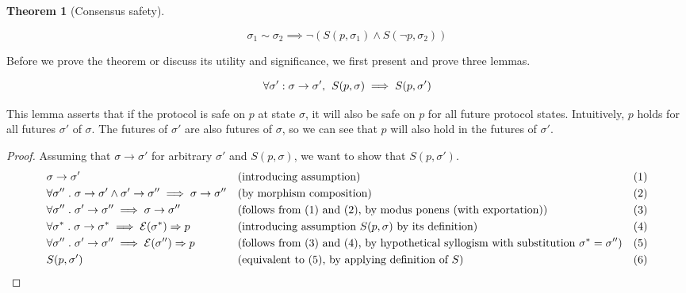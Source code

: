 \documentclass{article}
\theoremstyle{definition}
\newtheorem{thm}{Theorem}
\begin{document}
\begin{thm}[Consensus safety]
\begin{description}
$$
\sigma_1 \sim \sigma_2 \implies \neg(S(p,\sigma_1) \land S(\neg{p},\sigma_2))
$$
\end{description}
\end{thm}

Before we prove the theorem or discuss its utility and significance, we first present and prove three lemmas.

\vspace{5mm}

\begin{lemma}
$$
\forall \sigma':\sigma \to \sigma',\hspace{1.5mm} S(p,\sigma) \implies S(p,\sigma')
$$
\end{lemma}

This lemma asserts that if the protocol is safe on $p$ at state $\sigma$, it will also be safe on $p$ for all future protocol states. Intuitively, $p$ holds for all futures $\sigma'$ of $\sigma$. The futures of $\sigma'$ are also futures of $\sigma$, so we can see that $p$ will also hold in the futures of $\sigma'$.

\begin{proof}
Assuming that $\sigma \to \sigma'$ for arbitrary $\sigma'$ and $S(p, \sigma)$, we want to show that $S(p, \sigma')$.
  \begin{align*}
    &\sigma \to \sigma' &&\text{(introducing assumption)}   &&\text{(1)}\\
    &\forall \sigma'' \hspace{1mm}.\hspace{1mm}\sigma \to \sigma' \land \sigma' \to \sigma'' \implies \sigma \to \sigma'' &&\text{(by morphism composition)}   &&\text{(2)}\\
    &\forall \sigma'' \hspace{1mm}.\hspace{1mm}\sigma' \to \sigma'' \implies \sigma \to \sigma'' &&\text{(follows from (1) and (2), by modus ponens (with exportation))}   &&\text{(3)}\\
    &\forall \sigma^* \hspace{1mm}.\hspace{1mm}\sigma \to \sigma^* \implies \mathcal{E}(\sigma^*) \Rightarrow p &&\text{(introducing assumption $S(p, \sigma)$ by its definition) }   &&\text{(4)} \\
    &\forall \sigma'' \hspace{1mm}.\hspace{1mm}\sigma' \to \sigma'' \implies \mathcal{E}(\sigma'') \Rightarrow p &&\text{(follows from (3) and (4), by hypothetical syllogism with substitution $\sigma^* = \sigma''$)}   &&\text{(5)}\\
    &S(p, \sigma')  \hspace{5mm} \qedhere &&\text{(equivalent to (5), by applying definition of $S$) }   &&\text{(6)}
  \end{align*}
\end{proof}
\end{document}
